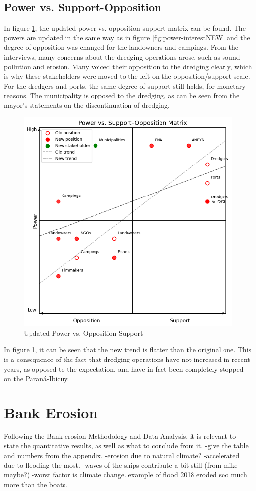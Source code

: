 \subsection{Power vs. Support-Opposition}
In figure \ref{fig:power-supportNEW}, the updated power vs. opposition-support-matrix can be found. The powers are updated in the same way as in figure \ref{fig:power-interestNEW} and the degree of opposition was changed for the landowners and campings. From the interviews, many concerns about the dredging operations arose, such as sound pollution and erosion. Many voiced their opposition to the dredging clearly, which is why these stakeholders were moved to the left on the opposition/support scale. For the dredgers and ports, the same degree of support still holds, for monetary reasons. The municipality is opposed to the dredging, as can be seen from the mayor's statements on the discontinuation of dredging.

\begin{figure}[H]
    \centering
    \includegraphics[width=0.70\linewidth]{figures/ch3/NewPowerVSSupport.png}
    \caption{Updated Power vs. Opposition-Support}
    \label{fig:power-supportNEW}
\end{figure}

In figure \ref{fig:power-supportNEW}, it can be seen that the new trend is flatter than the original one. This is a consequence of the fact that dredging operations have not increased in recent years, as opposed to the expectation, and have in fact been completely stopped on the Paraná-Ibicuy.

\section{Bank Erosion}

Following the Bank erosion Methodology and Data Analysis, it is relevant to state the quantitative results, as well as what to conclude from it. 
-give the table and numbers from the appendix.
-erosion due to natural climate?
-accelerated due to flooding the most. 
-waves of the ships contribute a bit still (from mike maybe?)
-worst factor is climate change. example of flood 2018 eroded soo much more than the boats. 